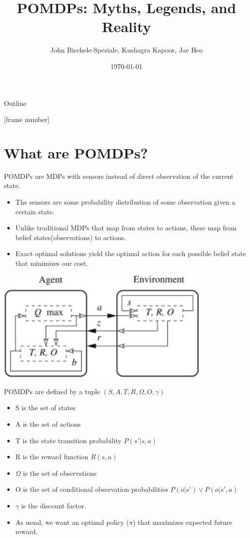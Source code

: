 \documentclass[presentation, smaller]{beamer}
\author{John Biechele-Speziale, Kushagra Kapoor, Jae Heo}
\date{\today}
\title{POMDPs: Myths, Legends, and Reality}
\begin{document}
\maketitle
\begin{frame}{Outline}
\setcounter{tocdepth}{1}
\tableofcontents
\end{frame}

[frame number]

\section{What are POMDPs?}
\label{sec:org3c744cc}

\begin{frame}[label={sec:org25d4a61}]{POMDPs are MDPs with sensors instead of direct observation of the current state.}
\begin{itemize}
\item The sensors are some probability distribution of some observation given a certain state.
\pause
\item Unlike traditional MDPs that map from states to actions, these map from belief states(observations) to actions.
\pause
\item Exact optimal solutions yield the optimal action for each possible belief state that minimizes our cost.
\end{itemize}
\pause
\begin{center}
\includegraphics[width=0.8\textwidth]{fig1.jpg}
\end{center}
\end{frame}

\begin{frame}[label={sec:orgacaa6fe}]{POMDPs are defined by a tuple \((S,A,T,R,\Omega,O,\gamma)\)}
\begin{itemize}
\item S is the set of states
\pause
\item A is the set of actions
\pause
\item T is the state transition probability \(P(s'|s,a)\)
\pause
\item R is the reward function \(R(s,a)\)
\pause
\item \(\Omega\) is the set of observations
\pause
\item O is the set of conditional observation probabilities \(P(o|s') \lor P(o|s',a)\)
\pause
\item \(\gamma\) is the discount factor.
\pause
\item As usual, we want an optimal policy (\(\pi\)) that maximizes expected future reward.
\end{itemize}
\end{frame}
\end{document}
